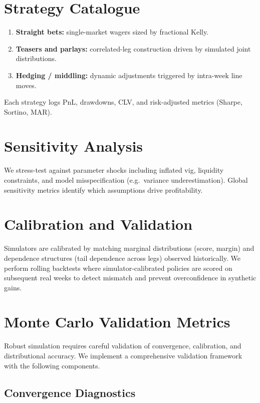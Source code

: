 
\section{Strategy Catalogue}
\begin{enumerate}
  \item \textbf{Straight bets:} single-market wagers sized by fractional Kelly.
  \item \textbf{Teasers and parlays:} correlated-leg construction driven by simulated joint distributions.
  \item \textbf{Hedging / middling:} dynamic adjustments triggered by intra-week line moves.
\end{enumerate}
Each strategy logs PnL, drawdowns, CLV, and risk-adjusted metrics (Sharpe, Sortino, MAR).

\section{Sensitivity Analysis}
We stress-test against parameter shocks including inflated vig, liquidity constraints, and model misspecification (e.g.\ variance underestimation). Global sensitivity metrics identify which assumptions drive profitability.

\section{Calibration and Validation}
Simulators are calibrated by matching marginal distributions (score, margin) and dependence structures (tail dependence across legs) observed historically. We perform rolling backtests where simulator-calibrated policies are scored on subsequent real weeks to detect mismatch and prevent overconfidence in synthetic gains.

\section{Monte Carlo Validation Metrics}
\label{sec:mc-validation}

Robust simulation requires careful validation of convergence, calibration, and distributional accuracy. We implement a comprehensive validation framework with the following components.

\subsection{Convergence Diagnostics}

